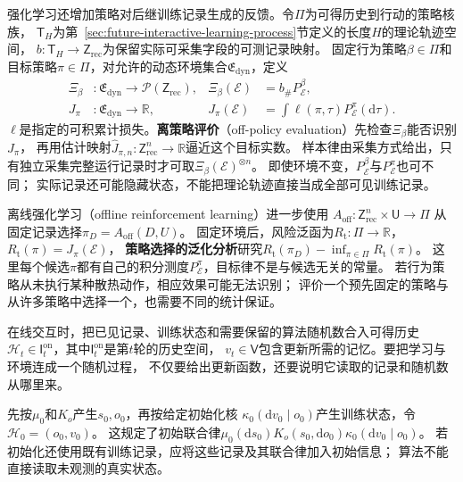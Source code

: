 强化学习还增加策略对后继训练记录生成的反馈。令$\Pi$为可得历史到行动的策略核族，
$\mathsf T_H$为第~\ref{sec:future-interactive-learning-process}节定义的长度$H$的理论轨迹空间，
$b:\mathsf T_H\to\mathsf Z_{\mathrm{rec}}$为保留实际可采集字段的可测记录映射。
固定行为策略$\beta\in\Pi$和目标策略$\pi\in\Pi$，对允许的动态环境集合$\mathfrak E_{\mathrm{dyn}}$，定义
\begin{equation}
  \begin{aligned}
    \Xi_\beta&:\mathfrak E_{\mathrm{dyn}}\to\mathcal P(\mathsf Z_{\mathrm{rec}}),
      &\Xi_\beta(\mathcal E)&=b_{\#}P_{\mathcal E}^{\beta},\\
    J_\pi&:\mathfrak E_{\mathrm{dyn}}\to\mathbb R,
      &J_\pi(\mathcal E)&=\int\ell(\pi,\tau)P_{\mathcal E}^{\pi}(\mathrm d\tau).
  \end{aligned}
  \label{eq:future-task-off-policy-maps}
\end{equation}
$\ell$是指定的可积累计损失。\textbf{离策略评价}（off-policy evaluation）先检查$\Xi_\beta$能否识别$J_\pi$，
再用估计映射$\widehat J_{\pi,n}:\mathsf Z_{\mathrm{rec}}^n\to\mathbb R$逼近这个目标实数。
样本律由采集方式给出，只有独立采集完整运行记录时才可取$\Xi_\beta(\mathcal E)^{\otimes n}$。
即使环境不变，$P_{\mathcal E}^{\beta}$与$P_{\mathcal E}^{\pi}$也可不同；
实际记录还可能隐藏状态，不能把理论轨迹直接当成全部可见训练记录。

离线强化学习（offline reinforcement learning）进一步使用
$A_{\mathrm{off}}:\mathsf Z_{\mathrm{rec}}^n\times\mathsf U\to\Pi$
从固定记录选择$\pi_D=A_{\mathrm{off}}(D,U)$。
固定环境后，风险泛函为$R_{\mathrm t}:\Pi\to\mathbb R$，$R_{\mathrm t}(\pi)=J_\pi(\mathcal E)$，
\textbf{策略选择的泛化分析}研究$R_{\mathrm t}(\pi_D)-\inf_{\pi\in\Pi}R_{\mathrm t}(\pi)$。
这里每个候选$\pi$都有自己的积分测度$P_{\mathcal E}^{\pi}$，目标律不是与候选无关的常量。
若行为策略从未执行某种散热动作，相应效果可能无法识别；
评价一个预先固定的策略与从许多策略中选择一个，也需要不同的统计保证。

在线交互时，把已见记录、训练状态和需要保留的算法随机数合入可得历史
$\mathscr H_t\in\mathsf I_t^{\mathrm{on}}$，其中$\mathsf I_t^{\mathrm{on}}$是第$t$轮的历史空间，
$v_t\in\mathsf V$包含更新所需的记忆。要把学习与环境连成一个随机过程，
不仅要给出更新函数，还要说明它读取的记录和随机数从哪里来。

先按$\mu_0$和$K_o$产生$s_0,o_0$，再按给定初始化核
$\kappa_0(\mathrm dv_0\mid o_0)$产生训练状态，令$\mathscr H_0=(o_0,v_0)$。
这规定了初始联合律$\mu_0(\mathrm ds_0)K_o(s_0,\mathrm do_0)\kappa_0(\mathrm dv_0\mid o_0)$。
若初始化还使用既有训练记录，应将这些记录及其联合律加入初始信息；
算法不能直接读取未观测的真实状态。

